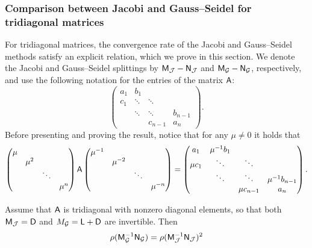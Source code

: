 \subsubsection{Comparison between Jacobi and Gauss--Seidel for tridiagonal matrices~\moreinfo}%
\label{ssub:comparison_between_jacobi_and_gauss_seidel_for_tridiagonal_matrices}
For tridiagonal matrices,
the convergence rate of the Jacobi and Gauss--Seidel methods satisfy an explicit relation,
which we prove in this section.
We denote the Jacobi and Gauss--Seidel splittings by $\mathsf M_{\mathcal J} - \mathsf N_{\mathcal J}$ and  $\mathsf M_{\mathcal G} - \mathsf N_{\mathcal G}$,
respectively,
and use the following notation for the entries of the matrix $\mathsf A$:
\[
    \begin{pmatrix}
        a_1 & b_1 \\
        c_1 & \ddots & \ddots  \\
             & \ddots & \ddots & b_{n-1} \\
             & & c_{n-1} & a_n
    \end{pmatrix}.
\]
Before presenting and proving the result,
notice that for any $\mu \neq 0$ it holds that
\begin{equation}
    \label{eq:preliminary_equation}
    \begin{pmatrix}
        \mu \\
        & \mu^{2} &  \\
        & & \ddots & \\
        & & & \mu^{n}
    \end{pmatrix}
    \mathsf A
    \begin{pmatrix}
        \mu^{-1}  \\
        & \mu^{-2} &  \\
        & & \ddots & \\
        & & & \mu^{-n}
    \end{pmatrix}
    =
    \begin{pmatrix}
        a_1 & \mu^{-1} b_1 \\
        \mu c_1 & \ddots & \ddots  \\
             & \ddots & \ddots & \mu^{-1} b_{n-1} \\
             & & \mu c_{n-1} & a_n
    \end{pmatrix}.
\end{equation}
\begin{proposition}
    \label{proposition:tridiagonal}
    Assume that $\mathsf A$ is tridiagonal with nonzero diagonal elements,
    so that both $\mathsf M_{\mathcal J} = \mathsf D$ and $\mathsf {\mathsf} M_{\mathcal G} = \mathsf L + \mathsf D$ are invertible.
    Then
    \[
        \rho(\mathsf M_{\mathcal G}^{-1} \mathsf N_{\mathcal  G})
        = \rho(\mathsf M_{\mathcal J}^{-1} \mathsf N_{\mathcal  J})^2
    \]
\end{proposition}
